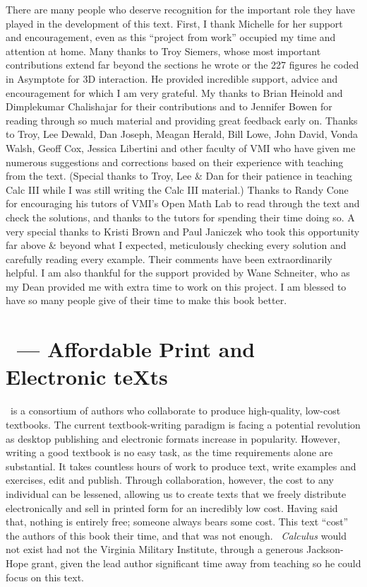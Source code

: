 There are many people who deserve recognition for the important role they have played in the development of this text. First, I thank Michelle for her support and encouragement, even as this ``project from work'' occupied my time and attention at home. Many thanks to Troy Siemers, whose most important contributions extend far beyond the sections he wrote or the 227 figures he coded in Asymptote for 3D interaction.  He provided incredible support, advice and encouragement for which I am very grateful. My thanks to Brian Heinold and Dimplekumar Chalishajar for their contributions and to Jennifer Bowen for reading through so much material and providing great feedback early on. Thanks to Troy, Lee Dewald, Dan Joseph, Meagan Herald, Bill Lowe, John David, Vonda Walsh, Geoff Cox, Jessica Libertini and other faculty of VMI who have given me numerous suggestions and corrections based on their experience with teaching from the text. (Special thanks to Troy, Lee \& Dan for their patience in teaching Calc III while I was still writing the Calc III material.) Thanks to Randy Cone for encouraging his tutors of VMI's Open Math Lab to read through the text and check the solutions, and thanks to the tutors for spending their time doing so. A very special thanks to Kristi Brown and Paul Janiczek who took this opportunity far above \& beyond what I expected, meticulously checking every solution and carefully reading every example. Their comments have been extraordinarily helpful. I am also thankful for the support provided by Wane Schneiter, who as my Dean provided me with extra time to work on this project. I am blessed to have so many people give of their time to make this book better.

\section*{\apex\ --- Affordable Print and Electronic teXts}

\apex\ is a consortium of authors  who collaborate to produce high-quality, low-cost textbooks. The current textbook-writing paradigm is facing a potential revolution as desktop publishing and electronic formats increase in popularity. However, writing a good textbook is no easy task, as the time requirements alone are substantial. It takes countless hours of work to produce text, write examples and exercises, edit and publish. Through collaboration, however, the cost to any individual can be lessened, allowing us to create texts that we freely distribute electronically and sell in printed form for an incredibly low cost. Having said that, nothing is entirely free; someone always bears some cost. This text ``cost'' the authors of this book their time, and that was not enough. \emph{\apex\ Calculus} would not exist had not the Virginia Military Institute, through a generous Jackson-Hope grant, given the lead author significant time away from teaching so he could focus on this text.

